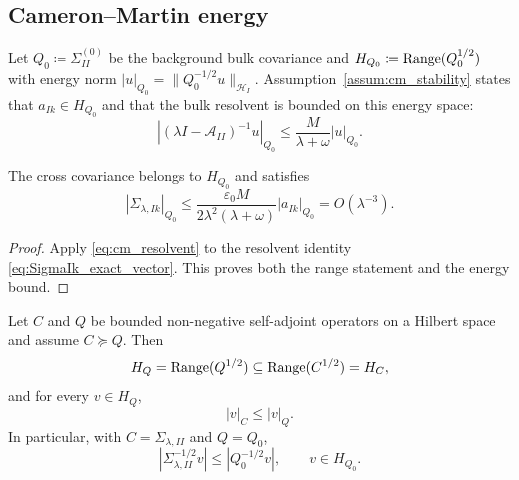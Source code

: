 \subsection{Cameron--Martin energy}

Let $Q_0\coloneqq\Sigma_{II}^{(0)}$ be the background bulk covariance and
$H_{Q_0}\coloneqq\operatorname{Range}(Q_0^{1/2})$ with energy norm
$|u|_{Q_0}=\|Q_0^{-1/2}u\|_{\mathcal{H}_I}$.  Assumption~\ref{assum:cm_stability}
states that $a_{Ik}\in H_{Q_0}$ and that the bulk resolvent is bounded on this
energy space:
\begin{equation}
  |(\lambda I-\mathcal{A}_{II})^{-1}u|_{Q_0}
  \le \frac{M}{\lambda+\omega}|u|_{Q_0}.
  \label{eq:cm_resolvent}
\end{equation}

\begin{lemma}
\label{lem:finite_energy_leakage}
The cross covariance belongs to $H_{Q_0}$ and satisfies
\begin{equation}
 |\Sigma_{\lambda,Ik}|_{Q_0}
 \le
 \frac{\varepsilon_0M}{2\lambda^2(\lambda+\omega)}
 |a_{Ik}|_{Q_0}
 =O(\lambda^{-3}).
 \label{eq:cross_energy}
\end{equation}
\end{lemma}

\begin{proof}
Apply \eqref{eq:cm_resolvent} to the resolvent identity
\eqref{eq:SigmaIk_exact_vector}.  This proves both the range statement and the
energy bound.
\end{proof}

\begin{lemma}
\label{lem:form_domain_energy_domination}
Let $C$ and $Q$ be bounded non-negative self-adjoint operators on a Hilbert
space and assume $C\succeq Q$.  Then
\begin{equation}
  H_Q=\operatorname{Range}(Q^{1/2})\subseteq \operatorname{Range}(C^{1/2})=H_C,
  \label{eq:range_inclusion_CQ}
\end{equation}
and for every $v\in H_Q$,
\begin{equation}
  |v|_C\le |v|_Q.
  \label{eq:energy_domination_CQ}
\end{equation}
In particular, with $C=\Sigma_{\lambda,II}$ and $Q=Q_0$,
\begin{equation}
  |\Sigma_{\lambda,II}^{-1/2}v|
  \le |Q_0^{-1/2}v|,
  \qquad v\in H_{Q_0}.
  \label{eq:Sigma_energy_dominated_by_Q0}
\end{equation}
\end{lemma}


